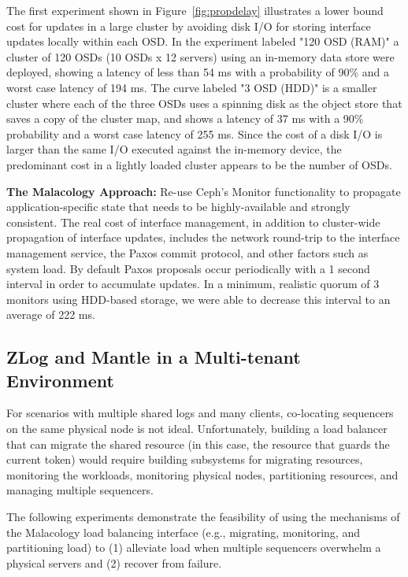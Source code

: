 \documentclass[preprint]{sigplanconf-eurosys}
\begin{document}
The first experiment shown in Figure~\ref{fig:propdelay} illustrates a lower
bound cost for updates in a large cluster by avoiding disk I/O for storing
interface updates locally within each OSD.  In the experiment labeled "120 OSD
(RAM)" a cluster of 120 OSDs (10 OSDs x 12 servers) using an in-memory data
store were deployed, showing a latency of less than 54 ms with a probability
of 90\% and a worst case latency of 194 ms. The curve labeled "3 OSD (HDD)" is
a smaller cluster where each of the three OSDs uses a spinning disk as the
object store that saves a copy of the cluster map, and shows a latency of 37
ms with a 90\% probability and a worst case latency of 255 ms. Since the cost
of a disk I/O is larger than the same I/O executed against the in-memory
device, the predominant cost in a lightly loaded cluster appears to be the
number of OSDs.

\textbf{The Malacology Approach:} Re-use Ceph's Monitor functionality to
propagate application-specific state that needs to be highly-available and
strongly consistent.  The real cost of interface management, in addition to
cluster-wide propagation of interface updates, includes the network round-trip
to the interface management service, the Paxos commit protocol, and other
factors such as system load. By default Paxos proposals occur periodically with
a 1 second interval in order to accumulate updates. In a minimum, realistic
quorum of 3 monitors using HDD-based storage, we were able to decrease this
interval to an average of 222 ms.

\subsection{ZLog and Mantle in a Multi-tenant Environment}

For scenarios with multiple shared logs and many clients, co-locating
sequencers on the same physical node is not ideal. Unfortunately, building a
load balancer that can migrate the shared resource (in this case, the resource
that guards the current token) would require building subsystems for migrating
resources, monitoring the workloads, monitoring physical nodes, partitioning
resources, and managing multiple sequencers.

The following experiments demonstrate the feasibility of using the mechanisms
of the Malacology load balancing interface (e.g., migrating, monitoring, and
partitioning load) to (1) alleviate load when multiple sequencers overwhelm a
physical servers and (2) recover from failure.
\end{document}
